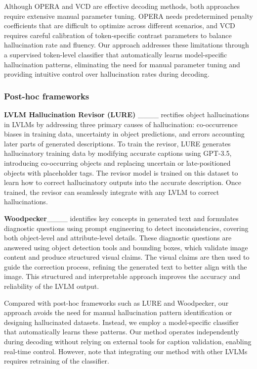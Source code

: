 Although OPERA and VCD are effective decoding methods, both approaches require extensive manual parameter tuning. OPERA needs predetermined penalty coefficients that are difficult to optimize across different scenarios, and VCD requires careful calibration of token-specific contrast parameters to balance hallucination rate and fluency. Our approach addresses these limitations through a supervised token-level classifier that automatically learns model-specific hallucination patterns, eliminating the need for manual parameter tuning and providing intuitive control over hallucination rates during decoding.

\subsubsection{Post-hoc frameworks}\label{subsubsec-posthoc}
\textbf{LVLM Hallucination Revisor (LURE)} ____ rectifies object hallucinations in LVLMs by addressing three primary causes of hallucination: co-occurrence biases in training data, uncertainty in object predictions, and errors accounting later parts of generated descriptions. To train the revisor, LURE generates hallucinatory training data by modifying accurate captions using GPT-3.5, introducing co-occurring objects and replacing uncertain or late-positioned objects with placeholder tags. The revisor model is trained on this dataset to learn how to correct hallucinatory outputs into the accurate description. Once trained, the revisor can seamlessly integrate with any LVLM to correct hallucinations. 

\textbf{Woodpecker}____ identifies key concepts in generated text and formulates diagnostic questions using prompt engineering to detect inconsistencies, covering both object-level and attribute-level details. These diagnostic questions are answered using object detection tools and bounding boxes, which validate image content and produce structured visual claims. The visual claims are then used to guide the correction process, refining the generated text to better align with the image. This structured and interpretable approach improves the accuracy and reliability of the LVLM output.

Compared with post-hoc frameworks such as LURE and Woodpecker, our approach avoids the need for manual hallucination pattern identification or designing hallucinated datasets. Instead, we employ a model-specific classifier that automatically learns these patterns. Our method operates independently during decoding without relying on external tools for caption validation, enabling real-time control. However, note that integrating our method with other LVLMs requires retraining of the classifier.

